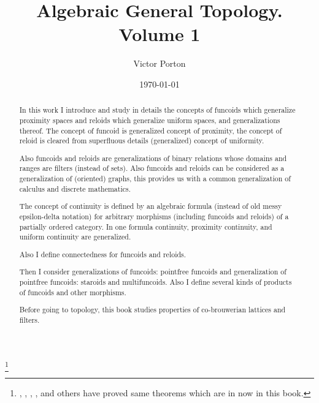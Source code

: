 \documentclass[a4paper,oneside,english,reqno]{amsbook}
\numberwithin{section}{chapter}
\begin{document}
\title{Algebraic General Topology. Volume 1}


\author{Victor Porton}






\date{\today}


\thanks{, , , , and others have proved same theorems which are in now in this book.}
\begin{abstract}
In this work I introduce and study in details the concepts of funcoids
which generalize proximity spaces and reloids which generalize uniform
spaces, and generalizations thereof. The concept of funcoid is generalized
concept of proximity, the concept of reloid is cleared from superfluous
details (generalized) concept of uniformity. 

Also funcoids and reloids are generalizations of binary relations
whose domains and ranges are filters (instead of sets). Also funcoids
and reloids can be considered as a generalization of (oriented) graphs,
this provides us with a common generalization of calculus and discrete
mathematics.

The concept of continuity is defined by an algebraic formula (instead
of old messy epsilon-delta notation) for arbitrary morphisms (including
funcoids and reloids) of a partially ordered category. In one formula
continuity, proximity continuity, and uniform continuity are generalized.

Also I define connectedness for funcoids and reloids.

Then I consider generalizations of funcoids: pointfree funcoids and
generalization of pointfree funcoids: staroids and multifuncoids.
Also I define several kinds of products of funcoids and other morphisms.

Before going to topology, this book studies properties of co-brouwerian
lattices and filters.
\end{abstract}





\maketitle
\end{document}
